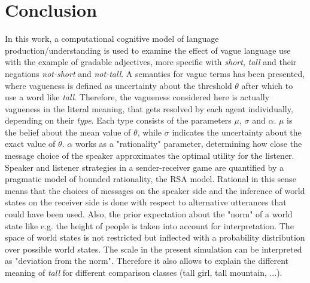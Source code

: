 \chapter{Conclusion}
\label{sec:conclusion}

In this work, a computational cognitive model of language production/understanding is used to examine the effect of vague language use with the example of gradable adjectives, more specific with \textit{short}, \textit{tall} and their negations \textit{not-short} and \textit{not-tall}. A semantics for vague terms has been presented, where vagueness is defined as uncertainty about the threshold $\theta$ after which to use a word like \textit{tall}. Therefore, the vagueness considered here is actually vagueness in the literal meaning, that gets resolved by each agent individually, depending on their \textit{type}. Each type consists of the parameters $\mu$, $\sigma$ and $\alpha$. $\mu$ is the belief about the mean value of $\theta$, while $\sigma$ indicates the uncertainty about the exact value of $\theta$. $\alpha$ works as a "rationality" parameter, determining how close the message choice of the speaker approximates the optimal utility for the listener.\\

Speaker and listener strategies in a sender-receiver game are quantified by a pragmatic model of bounded rationality, the RSA model. Rational in this sense means that the choices of messages on the speaker side and the inference of world states on the receiver side is done with respect to alternative utterances that could have been used.
Also, the prior expectation about the "norm" of a world state like e.g. the height of people is taken into account for interpretation. The space of world states is not restricted but inflected with a probability distribution over possible world states.
The scale in the present simulation can be interpreted as "deviation from the norm". Therefore it also allows to explain the different meaning of \textit{tall} for different comparison classes (tall girl, tall mountain, ...).\\

